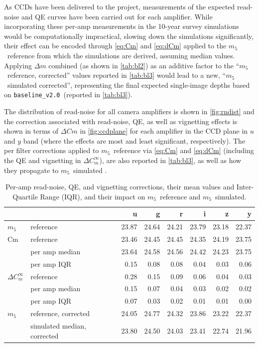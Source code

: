 \documentclass[PST,authoryear,toc]{lsstdoc}
\newcommand{\mf}{\ensuremath{m_5}}
\newcommand{\baseline}{\texttt{baseline\_v2.0}}
\begin{document}
As CCDs have been delivered to the project, measurements of the expected read-noise and QE curves have been carried out for each amplifier. While incorporating these per-amp measurements in the 10-year survey simulations would be computationally impractical, slowing down the simulations significantly, their effect can be encoded through \autoref{eq:Cm} and \autoref{eq:dCm} applied to the \mf\ reference from which the simulations are derived, assuming median values. Applying $\Delta m$ combined (as shown in \autoref{tab:bl2}) as an additive factor to the ``\mf\ reference, corrected'' values reported in \autoref{tab:bl3} would lead to a new,  ``\mf\ simulated corrected'', representing the final expected single-image depths based on \baseline\ (reported in \autoref{tab:bl3}).

The distribution of read-noise for all camera amplifiers is shown in \autoref{fig:rndist} and the correction associated with read-noise, QE, as well as vignetting effects is shown in terms of $\Delta Cm$ in \autoref{fig:ccdplane} for each amplifier in the CCD plane in $u$ and $y$ band (where the effects are most and least significant, respectively).
The per filter corrections applied to \mf\ reference via \autoref{eq:Cm} and \autoref{eq:dCm} (including the QE and vignetting in $\Delta C_m^\infty$), are also reported in \autoref{tab:bl3}, as well as how they propagate to \mf\ simulated .

\FloatBarrier

\begin{table}\caption{Per-amp read-noise, QE, and vignetting corrections, their mean values and Inter-Quartile Range (IQR), and their impact on \mf\ reference and \mf\ simulated.}\label{tab:bl3}
    \centering
 \begin{tabular}{llrrrrrr}
 \hline
 {} & &             u &      g &  r &   i &     z &      y \\
\hline
\mf &  reference &  23.87 &  24.64 &  24.21 &  23.79 &  23.18 &  22.37 \\
\hline
\hline
Cm & reference &  23.46 &  24.45 &  24.45 &  24.35 &  24.19 &  23.75 \\
 &per amp median       &  23.64 &  24.58 &  24.56 &  24.42 &  24.23 &  23.75 \\
& per amp IQR          &   0.15 &   0.08 &   0.08 &   0.04 &   0.03 &   0.06 \\
\hline
 $\Delta C_m^\infty$ & reference       &   0.28 &   0.15 &   0.09 &   0.06 &   0.04 &   0.03 \\
 & per amp median  &   0.15 &   0.07 &   0.04 &   0.03 &   0.02 &   0.02 \\
 & per amp IQR     &   0.07 &   0.03 &   0.02 &   0.01 &   0.01 &   0.00 \\
  \hline
  \hline
\mf & reference, corrected       &  24.05 &  24.77 &  24.32 &  23.86 &  23.22 &  22.37 \\
&simulated median, corrected    &  23.80 &  24.50 &  24.03 &  23.41 &  22.74 &  21.96 \\ 
\end{tabular}
\end{table}
\FloatBarrier
\clearpage
\end{document}
